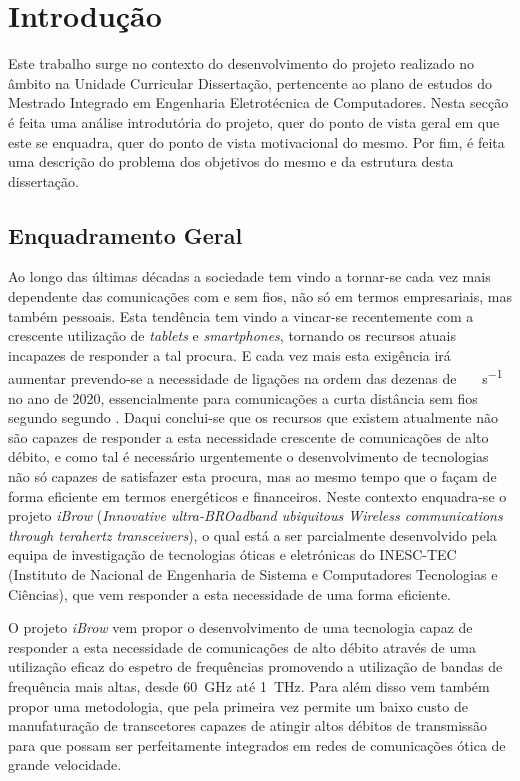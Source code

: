 \chapter{Introdução} \label{chap:intro}

Este trabalho surge no contexto do desenvolvimento do projeto realizado no âmbito na Unidade Curricular Dissertação, pertencente ao plano de estudos do Mestrado Integrado em Engenharia Eletrotécnica de Computadores. Nesta secção é feita uma análise introdutória do projeto, quer do ponto de vista geral em que este se enquadra, quer do ponto de vista motivacional do mesmo. Por fim, é feita uma descrição do problema dos objetivos do mesmo e da estrutura desta dissertação. 


\section{Enquadramento Geral} \label{sec:context}
Ao longo das últimas décadas a sociedade tem vindo a tornar-se cada vez mais dependente das comunicações com e sem fios, não só em termos empresariais, mas também pessoais. Esta tendência tem vindo a vincar-se recentemente com a crescente utilização de \textit{tablets} e \textit{smartphones}, tornando os recursos atuais incapazes de responder a tal procura. E cada vez mais esta exigência irá aumentar prevendo-se a necessidade de ligações na ordem das dezenas de \SI{}{\giga\bit\per\second} no ano de 2020, essencialmente para comunicações a curta distância sem fios segundo  segundo \cite{R040}. Daqui conclui-se que os recursos que existem atualmente não são capazes de responder a esta necessidade crescente de comunicações de alto débito, e como tal é necessário urgentemente o desenvolvimento de tecnologias não só capazes de satisfazer esta procura, mas ao mesmo tempo que o façam de forma eficiente em termos energéticos e financeiros. Neste contexto enquadra-se o projeto \textit{iBrow} (\textit{Innovative ultra-BROadband ubiquitous Wireless communications through terahertz transceivers}), o qual está a ser parcialmente desenvolvido pela equipa de investigação de tecnologias óticas e eletrónicas do INESC-TEC (Instituto de Nacional de Engenharia de Sistema e Computadores Tecnologias e Ciências), que vem responder a esta necessidade de uma forma eficiente.

O projeto \textit{iBrow} vem propor o desenvolvimento de uma tecnologia capaz de responder a esta necessidade de comunicações de alto débito através de uma utilização eficaz do espetro de frequências promovendo a utilização de bandas de frequência mais altas, desde \SI{60}{\giga\hertz}  até \SI{1}{\tera\hertz}. Para além disso vem também propor uma metodologia, que pela primeira vez permite um baixo custo de manufaturação de transcetores capazes de atingir altos débitos de transmissão para que possam ser perfeitamente integrados em redes de comunicações ótica de grande velocidade.
 
